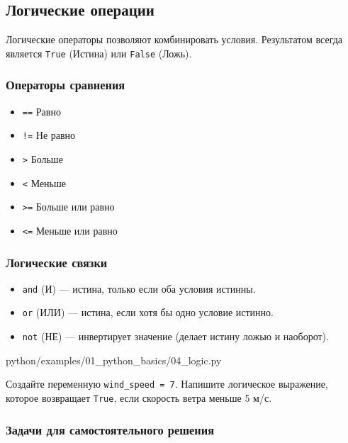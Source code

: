 \subsection{Логические операции}

Логические операторы позволяют комбинировать условия. Результатом всегда является \texttt{True} (Истина) или \texttt{False} (Ложь).

\subsubsection*{Операторы сравнения}
\begin{itemize}
    \item \texttt{==} Равно
    \item \texttt{!=} Не равно
    \item \texttt{>} Больше
    \item \texttt{<} Меньше
    \item \texttt{>=} Больше или равно
    \item \texttt{<=} Меньше или равно
\end{itemize}

\subsubsection*{Логические связки}
\begin{itemize}
    \item \texttt{and} (И) — истина, только если оба условия истинны.
    \item \texttt{or} (ИЛИ) — истина, если хотя бы одно условие истинно.
    \item \texttt{not} (НЕ) — инвертирует значение (делает истину ложью и наоборот).
\end{itemize}

\begin{codefile}[python]{python/examples/01_python_basics/04_logic.py}
\end{codefile}

\begin{taskbox}
Создайте переменную \texttt{wind\_speed = 7}. Напишите логическое выражение, которое возвращает \texttt{True}, если скорость ветра меньше 5 м/с.
\end{taskbox}

\subsubsection*{Задачи для самостоятельного решения}

